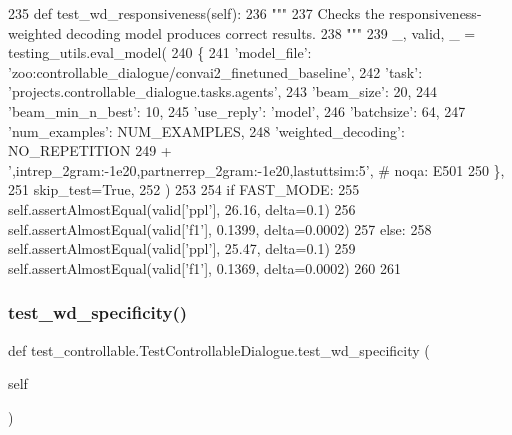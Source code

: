 \begin{DoxyCode}
235     \textcolor{keyword}{def }test\_wd\_responsiveness(self):
236         \textcolor{stringliteral}{"""}
237 \textcolor{stringliteral}{        Checks the responsiveness-weighted decoding model produces correct results.}
238 \textcolor{stringliteral}{        """}
239         \_, valid, \_ = testing\_utils.eval\_model(
240             \{
241                 \textcolor{stringliteral}{'model\_file'}: \textcolor{stringliteral}{'zoo:controllable\_dialogue/convai2\_finetuned\_baseline'},
242                 \textcolor{stringliteral}{'task'}: \textcolor{stringliteral}{'projects.controllable\_dialogue.tasks.agents'},
243                 \textcolor{stringliteral}{'beam\_size'}: 20,
244                 \textcolor{stringliteral}{'beam\_min\_n\_best'}: 10,
245                 \textcolor{stringliteral}{'use\_reply'}: \textcolor{stringliteral}{'model'},
246                 \textcolor{stringliteral}{'batchsize'}: 64,
247                 \textcolor{stringliteral}{'num\_examples'}: NUM\_EXAMPLES,
248                 \textcolor{stringliteral}{'weighted\_decoding'}: NO\_REPETITION
249                 + \textcolor{stringliteral}{',intrep\_2gram:-1e20,partnerrep\_2gram:-1e20,lastuttsim:5'},  \textcolor{comment}{# noqa: E501}
250             \},
251             skip\_test=\textcolor{keyword}{True},
252         )
253 
254         \textcolor{keywordflow}{if} FAST\_MODE:
255             self.assertAlmostEqual(valid[\textcolor{stringliteral}{'ppl'}], 26.16, delta=0.1)
256             self.assertAlmostEqual(valid[\textcolor{stringliteral}{'f1'}], 0.1399, delta=0.0002)
257         \textcolor{keywordflow}{else}:
258             self.assertAlmostEqual(valid[\textcolor{stringliteral}{'ppl'}], 25.47, delta=0.1)
259             self.assertAlmostEqual(valid[\textcolor{stringliteral}{'f1'}], 0.1369, delta=0.0002)
260 
261 
\end{DoxyCode}
\mbox{\label{classtest__controllable_1_1TestControllableDialogue_a357a886c76cc4d72cc2345eaee912f46}} 
\subsubsection{\texorpdfstring{test\+\_\+wd\+\_\+specificity()}{test\_wd\_specificity()}}
{\footnotesize\ttfamily def test\+\_\+controllable.\+Test\+Controllable\+Dialogue.\+test\+\_\+wd\+\_\+specificity (\begin{DoxyParamCaption}\item[{}]{self }\end{DoxyParamCaption})}

